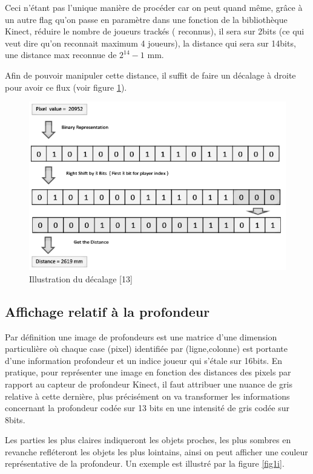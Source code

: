 \documentclass[12pt,a4paper,oneside]{book}
\begin{document}
	Ceci n'étant pas l'unique manière de procéder car on peut quand même, grâce à un autre flag qu'on passe en paramètre dans une fonction de la bibliothèque Kinect, réduire le nombre de joueurs trackés ( reconnus), il sera sur 2bits (ce qui veut dire qu'on reconnait maximum 4 joueurs), la distance qui sera sur 14bits, une distance max reconnue de $2^{14}-1$ mm.
	
	Afin de pouvoir manipuler cette distance, il suffit de faire un décalage à droite pour avoir ce flux (voir figure \ref{fig1d}).
	
	\begin{figure}[H]
		\centering
		\includegraphics[scale=0.6]{screenshot001.png}
		\caption{Illustration du décalage \textcolor[rgb]{1.00,0.00,0.00}{[13]}}
		\label{fig1d}
	\end{figure}
	
	\subsection{Affichage relatif à la profondeur}
	
	Par définition une image de profondeurs est une matrice d'une dimension particulière où chaque case (pixel) identifiée par (ligne,colonne) est portante  d'une information profondeur et un indice joueur qui s'étale sur 16bits.
	En pratique, pour représenter une image en fonction des distances des pixels par rapport au capteur de profondeur Kinect, il faut attribuer une nuance de gris relative à cette dernière, plus précisément on va transformer les informations concernant la profondeur codée sur 13 bits en une intensité de gris codée sur 8bits.
	
	Les parties les plus claires indiqueront les objets proches, les plus sombres en revanche refléteront les objets les plus lointains, ainsi on peut afficher une couleur représentative de la profondeur. Un exemple est illustré par la figure \ref{fig1i}.
	
\end{document}

